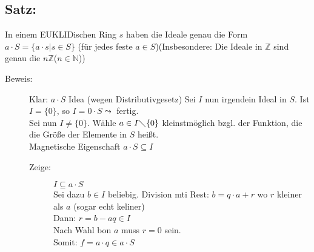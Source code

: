\subsection{Satz:}
In einem EUKLIDischen Ring $s$ haben die Ideale genau die Form $a \cdot S = \{a \cdot s|s \in S\}$ (für jedes feste $a\in S$)(Insbesondere: Die Ideale in $\mathbb{Z}$ sind genau die $n\mathbb{Z}$($n\in\mathbb{N}$))
\begin{description}
	\item[Beweis:] Klar: $a \cdot S$ Idea (wegen Distributivgesetz) Sei $I$ nun irgendein Ideal in $S$. Ist $I=\{0\}$, so 
				$I=0 \cdot S \leadsto$ fertig.\\
				Sei nun $I \neq \{0\}$. Wähle $a \in I \diagdown\{0\}$ kleinstmöglich bzgl. der Funktion, die die 
				Größe der Elemente in $S$ heißt.\\
				Magnetische Eigenschaft $a \cdot S \subseteq I$
				\begin{description}
					\item[Zeige:] $I \subseteq a \cdot S$\\
							Sei dazu $b \in I$ beliebig. Division mti Rest: $b=q \cdot a+r$ wo $r$ kleiner als 
							$a$ (sogar echt keliner)\\
							Dann: $r=b-aq \in I$\\
							Nach Wahl bon $a$ muss $r=0$ sein.\\
							Somit: $f = a \cdot q \in a \cdot S$
				\end{description}
\end{description}
%
%
%
